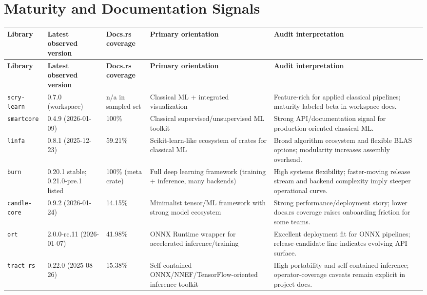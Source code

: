 \documentclass[11pt]{article}
\begin{document}
\section{Maturity and Documentation Signals}
\begin{longtable}{p{1.8cm}p{2.25cm}p{1.6cm}p{4.7cm}p{4.1cm}}
\toprule
\textbf{Library} & \textbf{Latest observed version} & \textbf{Docs.rs coverage} & \textbf{Primary orientation} & \textbf{Audit interpretation} \\
\midrule
\endfirsthead
\toprule
\textbf{Library} & \textbf{Latest observed version} & \textbf{Docs.rs coverage} & \textbf{Primary orientation} & \textbf{Audit interpretation} \\
\midrule
\endhead
\texttt{scry-learn} & 0.7.0 (workspace) & n/a in sampled set & Classical ML + integrated visualization & Feature-rich for applied classical pipelines; maturity labeled beta in workspace docs. \\
\texttt{smartcore} & 0.4.9 (2026-01-09) & 100\% & Classical supervised/unsupervised ML toolkit & Strong API/documentation signal for production-oriented classical ML. \\
\texttt{linfa} & 0.8.1 (2025-12-23) & 59.21\% & Scikit-learn-like ecosystem of crates for classical ML & Broad algorithm ecosystem and flexible BLAS options; modularity increases assembly overhead. \\
\texttt{burn} & 0.20.1 stable; 0.21.0-pre.1 listed & 100\% (meta crate) & Full deep learning framework (training + inference, many backends) & High systems flexibility; faster-moving release stream and backend complexity imply steeper operational curve. \\
\texttt{candle-core} & 0.9.2 (2026-01-24) & 14.15\% & Minimalist tensor/ML framework with strong model ecosystem & Strong performance/deployment story; lower docs.rs coverage raises onboarding friction for some teams. \\
\texttt{ort} & 2.0.0-rc.11 (2026-01-07) & 41.98\% & ONNX Runtime wrapper for accelerated inference/training & Excellent deployment fit for ONNX pipelines; release-candidate line indicates evolving API surface. \\
\texttt{tract-rs} & 0.22.0 (2025-08-26) & 15.38\% & Self-contained ONNX/NNEF/TensorFlow-oriented inference toolkit & High portability and self-contained inference; operator-coverage caveats remain explicit in project docs. \\
\bottomrule
\end{longtable}
\end{document}
